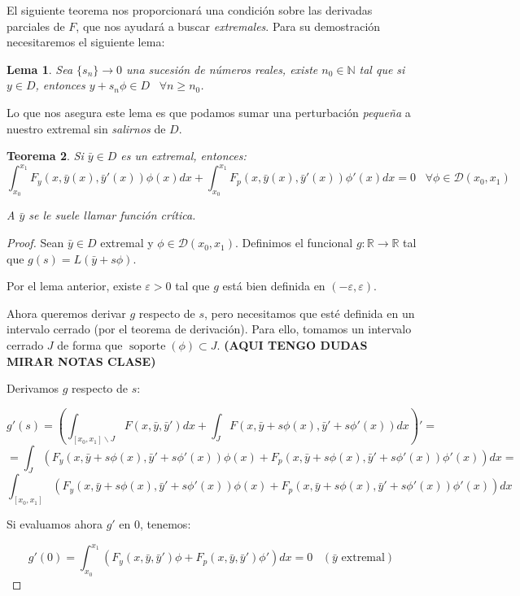 \documentclass[12pt]{article}
\newcommand{\N}{\mathbb{N}}
\newcommand{\R}{\mathbb{R}}
\newtheorem{theorem}{Teorema}[section]
\newtheorem{lemma}[theorem]{Lema}
\theoremstyle{definition}
\theoremstyle{remark}
\newcommand{\soportecompacto}{\mathcal{D}(x_0,x_1)}
\newcommand{\integral}[3]{\displaystyle\int_{ #1 }^{ #2 } #3 }
\DeclareMathOperator\supp{soporte}
\newcommand{\xcerocerrado}{[x_0,x_1]}
\newcommand{\espacio}{\;\;\;}
\begin{document}
El siguiente teorema nos proporcionará una condición sobre las derivadas parciales de $F$, que nos ayudará a buscar \textit{extremales}. Para su demostración necesitaremos el siguiente lema:

\begin{lemma}
\label{lemmatecnico}
Sea $\{s_n\}\longrightarrow 0$ una sucesión de números reales, existe $n_0\in\N$ tal que si $y\in D$, entonces $y+s_n\phi\in D \espacio \forall n\geq n_0$.
\end{lemma}

Lo que nos asegura este lema es que podamos sumar una perturbación \textit{pequeña} a nuestro extremal sin \textit{salirnos} de $D$.

\begin{theorem}
\label{theorem:1.7}
Si $\bar{y}\in D$ es un extremal, entonces:
\[
\integral{x_0}{x_1}{F_y(x,\bar{y}(x), \bar{y}'(x))}\phi(x)dx+\integral{x_0}{x_1}{F_p(x,\bar{y}(x), \bar{y}'(x))}\phi'(x)dx=0 \espacio \forall \phi\in \soportecompacto
\]

A $\bar{y}$ se le suele llamar función crítica.
\end{theorem}

\begin{proof}
Sean $\bar{y}\in D$ extremal y $\phi\in\soportecompacto$. Definimos el funcional $g:\R\longrightarrow\R$ tal que $g(s)=L(\bar{y}+s\phi)$.

Por el lema anterior, existe $\varepsilon>0$ tal que $g$ está bien definida en $(-\varepsilon,\varepsilon)$.

Ahora queremos derivar $g$ respecto de $s$, pero necesitamos que esté definida en un intervalo cerrado (por el teorema de derivación). Para ello, tomamos un intervalo cerrado $J$ de forma que $\supp (\phi)\subset J$. \textbf{(AQUI TENGO DUDAS MIRAR NOTAS CLASE)}

Derivamos $g$ respecto de $s$:

\[
g'(s)=\left(
\integral{\xcerocerrado\backslash J}{}{F(x,\bar{y},\bar{y}')dx}+
\integral{J}{}{F(x,\bar{y}+s\phi(x),\bar{y}'+s\phi'(x))dx}
\right)'=
\]
\[
= \integral{J}{}{\left(F_y(x,\bar{y}+s\phi(x),\bar{y}'+s\phi'(x))\phi(x)+F_p(x,\bar{y}+s\phi(x),\bar{y}'+s\phi'(x))\phi'(x)\right)dx}=
\]
\[
\integral{\xcerocerrado}{}{\left(F_y(x,\bar{y}+s\phi(x),\bar{y}'+s\phi'(x))\phi(x)+F_p(x,\bar{y}+s\phi(x),\bar{y}'+s\phi'(x))\phi'(x)\right)dx}
\]

Si evaluamos ahora $g'$ en 0, tenemos:

\[
g'(0)=\integral{x_0}{x_1}{\left(F_y(x,\bar{y},\bar{y}')\phi+F_p(x,\bar{y},\bar{y}')\phi'\right)dx}=0 \espacio(\bar{y}\text{ extremal})
\]

\end{proof}
\end{document}
